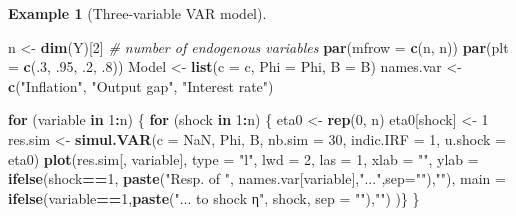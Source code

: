 \documentclass[
  12pt,
]{book}
\newenvironment{Shaded}{\begin{snugshade}}{\end{snugshade}}
\newcommand{\AttributeTok}[1]{\textcolor[rgb]{0.13,0.29,0.53}{#1}}
\newcommand{\CommentTok}[1]{\textcolor[rgb]{0.56,0.35,0.01}{\textit{#1}}}
\newcommand{\ConstantTok}[1]{\textcolor[rgb]{0.56,0.35,0.01}{#1}}
\newcommand{\ControlFlowTok}[1]{\textcolor[rgb]{0.13,0.29,0.53}{\textbf{#1}}}
\newcommand{\DecValTok}[1]{\textcolor[rgb]{0.00,0.00,0.81}{#1}}
\newcommand{\FunctionTok}[1]{\textcolor[rgb]{0.13,0.29,0.53}{\textbf{#1}}}
\newcommand{\NormalTok}[1]{#1}
\newcommand{\OtherTok}[1]{\textcolor[rgb]{0.56,0.35,0.01}{#1}}
\newcommand{\SpecialCharTok}[1]{\textcolor[rgb]{0.81,0.36,0.00}{\textbf{#1}}}
\newcommand{\StringTok}[1]{\textcolor[rgb]{0.31,0.60,0.02}{#1}}
\theoremstyle{definition}
\theoremstyle{definition}
\newtheorem{example}{Example}[chapter]
\theoremstyle{definition}
\theoremstyle{definition}
\theoremstyle{remark}
\begin{document}
\begin{example}[Three-variable VAR model]
\begin{Shaded}
\begin{Highlighting}[]
\NormalTok{n }\OtherTok{\textless{}{-}} \FunctionTok{dim}\NormalTok{(Y)[}\DecValTok{2}\NormalTok{] }\CommentTok{\# number of endogenous variables}
\FunctionTok{par}\NormalTok{(}\AttributeTok{mfrow =} \FunctionTok{c}\NormalTok{(n, n))}
\FunctionTok{par}\NormalTok{(}\AttributeTok{plt =} \FunctionTok{c}\NormalTok{(.}\DecValTok{3}\NormalTok{, .}\DecValTok{95}\NormalTok{, .}\DecValTok{2}\NormalTok{, .}\DecValTok{8}\NormalTok{))}
\NormalTok{Model }\OtherTok{\textless{}{-}} \FunctionTok{list}\NormalTok{(}\AttributeTok{c =}\NormalTok{ c, }\AttributeTok{Phi =}\NormalTok{ Phi, }\AttributeTok{B =}\NormalTok{ B)}
\NormalTok{names.var }\OtherTok{\textless{}{-}} \FunctionTok{c}\NormalTok{(}\StringTok{"Inflation"}\NormalTok{, }\StringTok{"Output gap"}\NormalTok{, }\StringTok{"Interest rate"}\NormalTok{)}

\ControlFlowTok{for}\NormalTok{ (variable }\ControlFlowTok{in} \DecValTok{1}\SpecialCharTok{:}\NormalTok{n) \{}
  \ControlFlowTok{for}\NormalTok{ (shock }\ControlFlowTok{in} \DecValTok{1}\SpecialCharTok{:}\NormalTok{n) \{}
\NormalTok{    eta0 }\OtherTok{\textless{}{-}} \FunctionTok{rep}\NormalTok{(}\DecValTok{0}\NormalTok{, n)}
\NormalTok{    eta0[shock] }\OtherTok{\textless{}{-}} \DecValTok{1}
\NormalTok{    res.sim }\OtherTok{\textless{}{-}} \FunctionTok{simul.VAR}\NormalTok{(}\AttributeTok{c =} \ConstantTok{NaN}\NormalTok{, Phi, B, }\AttributeTok{nb.sim =} \DecValTok{30}\NormalTok{, }\AttributeTok{indic.IRF =} \DecValTok{1}\NormalTok{,}
                         \AttributeTok{u.shock =}\NormalTok{ eta0)}
    \FunctionTok{plot}\NormalTok{(res.sim[, variable], }\AttributeTok{type =} \StringTok{"l"}\NormalTok{, }\AttributeTok{lwd =} \DecValTok{2}\NormalTok{, }\AttributeTok{las =} \DecValTok{1}\NormalTok{,}
         \AttributeTok{xlab =} \StringTok{""}\NormalTok{, }\AttributeTok{ylab =} \FunctionTok{ifelse}\NormalTok{(shock}\SpecialCharTok{==}\DecValTok{1}\NormalTok{,}
                                  \FunctionTok{paste}\NormalTok{(}\StringTok{"Resp. of "}\NormalTok{,}
\NormalTok{                                              names.var[variable],}\StringTok{"..."}\NormalTok{,}\AttributeTok{sep=}\StringTok{""}\NormalTok{),}\StringTok{""}\NormalTok{),}
         \AttributeTok{main =} \FunctionTok{ifelse}\NormalTok{(variable}\SpecialCharTok{==}\DecValTok{1}\NormalTok{,}\FunctionTok{paste}\NormalTok{(}\StringTok{"... to shock η"}\NormalTok{, shock, }\AttributeTok{sep =} \StringTok{""}\NormalTok{),}\StringTok{""}\NormalTok{)}
\NormalTok{         )\}}
\NormalTok{\}}
\end{Highlighting}
\end{Shaded}


\end{example}
\end{document}
